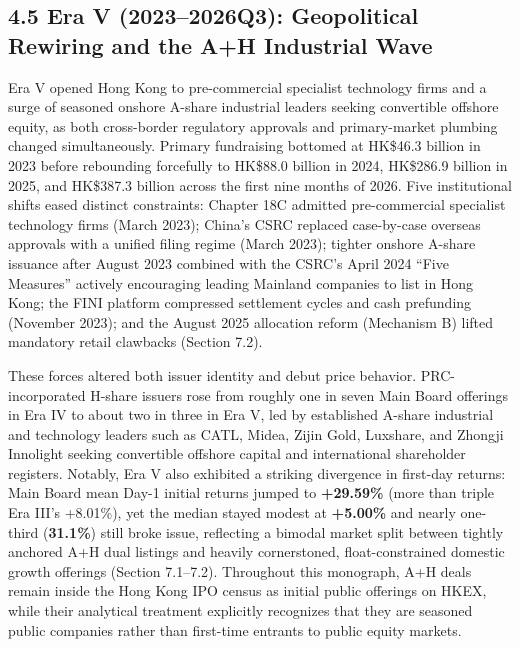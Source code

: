 \documentclass[11pt,letterpaper]{article}
\begin{document}
\subsection*{\texorpdfstring{4.5 Era V (2023–2026Q3): Geopolitical Rewiring and the A+H Industrial Wave}{4.5 Era V (2023–2026Q3): Geopolitical Rewiring and the A+H Industrial Wave}}
Era V opened Hong Kong to pre-commercial specialist technology firms and a surge of seasoned onshore A-share industrial leaders seeking convertible offshore equity, as both cross-border regulatory approvals and primary-market plumbing changed simultaneously. Primary fundraising bottomed at HK\$46.3 billion in 2023 before rebounding forcefully to HK\$88.0 billion in 2024, HK\$286.9 billion in 2025, and HK\$387.3 billion across the first nine months of 2026. Five institutional shifts eased distinct constraints: Chapter 18C admitted pre-commercial specialist technology firms (March 2023); China's CSRC replaced case-by-case overseas approvals with a unified filing regime (March 2023); tighter onshore A-share issuance after August 2023 combined with the CSRC's April 2024 ``Five Measures'' actively encouraging leading Mainland companies to list in Hong Kong; the FINI platform compressed settlement cycles and cash prefunding (November 2023); and the August 2025 allocation reform (Mechanism B) lifted mandatory retail clawbacks (Section 7.2).

These forces altered both issuer identity and debut price behavior. PRC-incorporated H-share issuers rose from roughly one in seven Main Board offerings in Era IV to about two in three in Era V, led by established A-share industrial and technology leaders such as CATL, Midea, Zijin Gold, Luxshare, and Zhongji Innolight seeking convertible offshore capital and international shareholder registers. Notably, Era V also exhibited a striking divergence in first-day returns: Main Board mean Day-1 initial returns jumped to \textbf{+29.59\%} (more than triple Era III's +8.01\%), yet the median stayed modest at \textbf{+5.00\%} and nearly one-third (\textbf{31.1\%}) still broke issue, reflecting a bimodal market split between tightly anchored A+H dual listings and heavily cornerstoned, float-constrained domestic growth offerings (Section 7.1–7.2). Throughout this monograph, A+H deals remain inside the Hong Kong IPO census as initial public offerings on HKEX, while their analytical treatment explicitly recognizes that they are seasoned public companies rather than first-time entrants to public equity markets.
\end{document}
